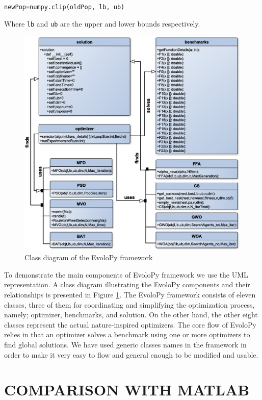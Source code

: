 \documentclass[a4paper,twoside]{article}
\begin{document}
\texttt{newPop=numpy.clip(oldPop, lb, ub)}

Where \texttt{lb} and \texttt{ub} are the upper and lower bounds respectively.

\begin{figure}
\centerline{\includegraphics[scale=0.35]{classD.eps}}
\caption{Class diagram of the EvoloPy framework}
\label{fig:framework}
\end{figure}

To demonstrate the main components of EvoloPy framework we use the UML representation. A class diagram illustrating the EvoloPy components and their relationships is presented in Figure \ref{fig:framework}. The EvoloPy framework consists of eleven classes, three of them for coordinating and simplifying the optimization process, namely; optimizer, benchmarks, and solution. On the other hand, the other eight classes represent the actual nature-inspired optimizers. The core flow of EvoloPy relies in that an optimizer solves a benchmark using one or more optimizers to find global solutions. We have used generic classes names in the framework in order to make it very easy to flow and general enough to be modified and usable. 




\section{\uppercase{Comparison with Matlab}}
\end{document}
